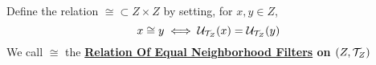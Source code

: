 \label{def:RelationOfEqualNeighborhoodFilters}
\newcommand{\RelationOfEqualNeighborhoodFilters}[1]{
    \bf \hyperref[def:RelationOfEqualNeighborhoodFilters]{Relation Of Equal Neighborhood Filters} \rm on #1
}
\begin{df}
	Define the relation 
	$\cong \subset Z \times Z$ 
	by setting, for $x,y \in Z$, 
    \begin{equation}
        x \cong y \iff \mathcal{U}_{\mathcal{T}_Z}(x)=\mathcal{U}_{\mathcal{T}_Z}(y)
    \end{equation}
    We call $\cong$ the \RelationOfEqualNeighborhoodFilters{$(Z,\mathcal{T}_Z)$}
\end{df} 